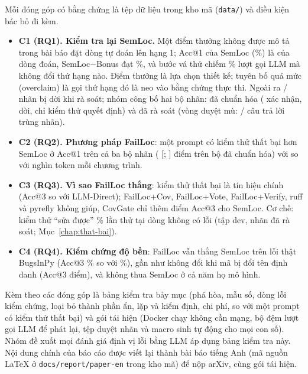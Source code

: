 Mỗi đóng góp có bằng chứng là tệp dữ liệu trong kho mã (\texttt{data/}) và điều kiện bác bỏ đi kèm.
\begin{itemize}
\item \textbf{C1 (RQ1). Kiểm tra lại SemLoc.} Một điểm thưởng không được mô tả trong bài báo đặt dòng tự đoán lên hạng
  1; Acc@1 của SemLoc (\RqTwoRepairedAllSemlocAccOneMean\%) là của dòng đoán, SemLoc−Bonus đạt
  \RqTwoRepairedAllSemlocNoPriorAccOneMean\%, và bước vá thử chiếm \CostCfSharePct\% lượt gọi LLM mà không đổi thứ hạng nào.
  Điểm thưởng là lựa chọn thiết kế; tuyên bố quá mức (overclaim) là gọi thứ hạng đó là neo vào bằng chứng thực thi.
  Ngoài ra \LabaudAllMoved{}/\LabaudAllN{} nhãn bị dời khi rà soát; nhóm công bố hai bộ nhãn: đã chuẩn hóa (\GtConfirmedN{}
  xác nhận, \GtCorrectedN{} dời, chỉ kiểm thử quyết định) và đã rà soát (vòng duyệt mù:
  \BlindBlindAllMatchReviewed{}/\BlindBlindAllNReviewed{} câu trả lời trùng nhãn).
\item \textbf{C2 (RQ2). Phương pháp FailLoc}: một prompt có kiểm thử thất bại hơn SemLoc ở Acc@1 trên cả ba bộ nhãn
  (\RqTwoRepairedAllLlmTestsDAccOne{} [\RqTwoRepairedAllLlmTestsDAccOneLo; \RqTwoRepairedAllLlmTestsDAccOneHi] điểm trên
  bộ đã chuẩn hóa) với \CostLlmTestsTokensK{} so với \CostSemlocTokensK{} nghìn token mỗi chương trình.
\item \textbf{C3 (RQ3). Vì sao FailLoc thắng}: kiểm thử thất bại là tín hiệu chính (Acc@3
  \AblRepairedAllTestsEffectDAccThree{} so với LLM-Direct); FailLoc+Cov, FailLoc+Vote, FailLoc+Verify, ruff và pyrefly
  không giúp, CovGate chỉ thêm \RqTwoRepairedAllCovgateDAccThree{} điểm Acc@3 cho SemLoc. Cơ chế: kiểm thử ``sửa được''
  \PavmechReviewedOtherLineFixable\% lần thử tại dòng không có lỗi (tập dev, nhãn đã rà soát; Mục~\ref{chap:that-bai}).
\item \textbf{C4 (RQ4). Kiểm chứng độ bền}: FailLoc vẫn thắng SemLoc trên lỗi thật BugsInPy (Acc@3
  \BipAllLlmTestsAccThreeMean\% so với \BipAllSemlocPriorAccThreeMean\%), gần như không đổi khi mã bị đổi tên định danh
  (Acc@3 \RenRepairedLlmTestsDAccThree{} điểm), và không thua SemLoc ở cả năm họ mô hình.
\end{itemize}

Kèm theo các đóng góp là bảng kiểm tra bảy mục (phá hòa, mẫu số, dòng lỗi kiểm chứng, loại bỏ thành phần ẩn, lặp và
kiểm định, chi phí, so với một prompt có kiểm thử thất bại) và gói tái hiện (Docker chạy không cần mạng, bộ đệm lượt gọi
LLM để phát lại, tệp duyệt nhãn và macro sinh tự động cho mọi con số). Nhóm đề xuất mọi đánh giá định vị lỗi bằng LLM áp
dụng bảng kiểm tra này. Nội dung chính của báo cáo được
viết lại thành bài báo tiếng Anh (mã nguồn \LaTeX{} ở \texttt{docs/report/paper-en} trong kho mã) để nộp arXiv, cùng gói tái hiện.

